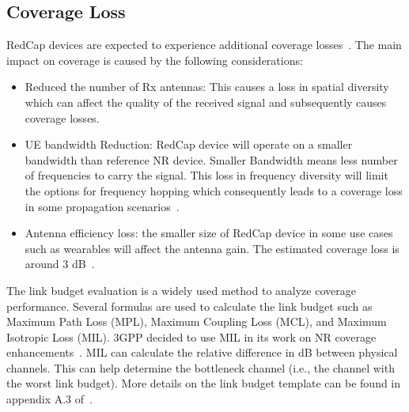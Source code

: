 \documentclass[]{IEEEtran}
\begin{document}
\subsection{Coverage Loss}
\label{sec:6-1}


RedCap devices are expected to experience additional coverage losses~\cite{moloudi_coverage_2021}.
The main impact on coverage is caused by the following considerations:
\begin{itemize}
    \item Reduced the number of Rx antennas: This causes a loss in spatial diversity which can affect the quality of the received signal and subsequently causes coverage losses. 
    \item UE bandwidth Reduction: RedCap device will operate on a smaller bandwidth than reference NR device.
    Smaller Bandwidth means less number of frequencies to carry the signal.
    This loss in frequency diversity will limit the options for frequency hopping which consequently leads to a coverage loss in some propagation scenarios~\cite{ratasuk_reduced_2021}.
    \item Antenna efficiency loss: the smaller size of RedCap device in some use cases such as wearables will affect the antenna gain. The estimated coverage loss is around 3 dB~\cite{3gpp_study_2021_38.875}.
\end{itemize}

The link budget evaluation is a widely used method to analyze coverage performance.
Several formulas are used to calculate the link budget such as Maximum Path Loss (MPL), Maximum Coupling Loss (MCL), and Maximum Isotropic Loss (MIL).
3GPP decided to use MIL in its work on NR coverage enhancements~\cite{3gpp_study_nodate-3_38.830}.
MIL can calculate the relative difference in dB between physical channels.
This can help determine the bottleneck channel (i.e., the channel with the worst link budget).
More details on the link budget template can be found in appendix A.3 of~\cite{3gpp_study_nodate-3_38.830}. 
\end{document}
